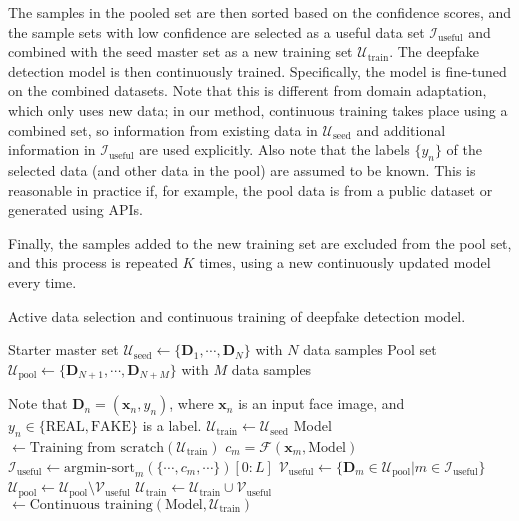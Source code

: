 \documentclass[english]{lni}
\begin{document}
The samples in the pooled set are then sorted based on the confidence scores, and the sample sets with low confidence are selected as a useful data set $\mathcal{I}_{\text{useful}}$ and combined with the seed master set as a new training set $\mathcal{U}_{\text{train}}$. The deepfake detection model is then continuously trained. Specifically, the model is fine-tuned on the combined datasets. Note that this is different from domain adaptation, which only uses new data; in our method, continuous training takes place using a combined set, so information from existing data in $\mathcal{U}_{\text{seed}}$ and additional information in $\mathcal{I}_{\text{useful}}$ are used explicitly. Also note that the labels $\{y_n\}$ of the selected data (and other data in the pool) are assumed to be known. This is reasonable in practice if, for example, the pool data is from a public dataset or generated using APIs.

Finally, the samples added to the new training set are excluded from the pool set, and this process is repeated $K$ times, using a new continuously updated model every time. 

\begin{algorithm}[t]
\caption{Active data selection and continuous training of deepfake detection model.}\label{alg:cap}
\begin{algorithmic}[1]
\Require Starter master set $\mathcal{U}_{\text{seed}}\leftarrow \{\boldsymbol{D}_1, \cdots, \boldsymbol{D}_N\}$ with $N$ data samples
\Require Pool set $\mathcal{U}_{\text{pool}}\leftarrow \{\boldsymbol{D}_{N+1}, \cdots, \boldsymbol{D}_{N+M}\}$ with $M$ data samples

\noindent Note that $\boldsymbol{D}_n=(\boldsymbol{x}_{n}, y_n)$, where $\boldsymbol{x}_{n}$ is an input face image, and $y_n \in\{\text{REAL}, \text{FAKE}\}$ is a label. 
\State $\mathcal{U}_{\text{train}} \leftarrow \mathcal{U}_{\text{seed}}$
\State Model $\leftarrow \text{Training from scratch}(\mathcal{U}_{\text{train}})$
\Repeat 
{}
\State $c_m = \mathcal{F}(\boldsymbol{x}_{m}, \text{Model})$ 
\EndFor
\State $\mathcal{I}_{\text{useful}}  \leftarrow \text{argmin-sort}_{m}(\{\cdots, c_{m}, \cdots\})[0:L]$ 
\State $\mathcal{V}_{\text{useful}} \leftarrow \{\boldsymbol{D}_m \in \mathcal{U}_{\text{pool}} | m \in \mathcal{I}_{\text{useful}} \}$ 
\State ${\mathcal{U}_{\text{pool}} \leftarrow \mathcal{U}_{\text{pool}} \setminus  \mathcal{V}_{\text{useful}}}$ 
\State $\mathcal{U}_{\text{train}} \leftarrow \mathcal{U}_{\text{train}} \cup \mathcal{V}_{\text{useful}}$ 
\State {} $\leftarrow \text{Continuous training}(\text{Model}, \mathcal{U}_{\text{train}})$ 
\end{algorithmic}
\end{algorithm}
\end{document}
